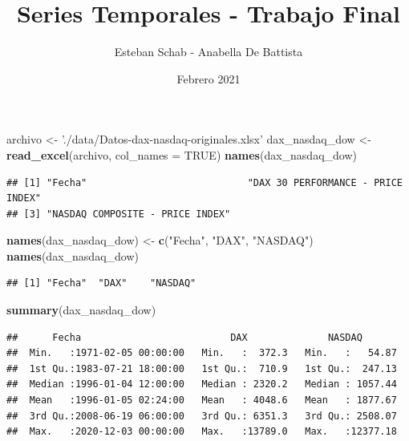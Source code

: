 \documentclass[
  11pt,
]{article}
\title{Series Temporales - Trabajo Final}
\author{Esteban Schab - Anabella De Battista}
\date{Febrero 2021}
\newenvironment{Shaded}{\begin{snugshade}}{\end{snugshade}}
\newcommand{\DataTypeTok}[1]{\textcolor[rgb]{0.13,0.29,0.53}{#1}}
\newcommand{\KeywordTok}[1]{\textcolor[rgb]{0.13,0.29,0.53}{\textbf{#1}}}
\newcommand{\NormalTok}[1]{#1}
\newcommand{\OtherTok}[1]{\textcolor[rgb]{0.56,0.35,0.01}{#1}}
\newcommand{\StringTok}[1]{\textcolor[rgb]{0.31,0.60,0.02}{#1}}
\begin{document}
\maketitle

{
\setcounter{tocdepth}{2}
\tableofcontents
}
\begin{Shaded}
\begin{Highlighting}[]
\NormalTok{archivo <-}\StringTok{ './data/Datos-dax-nasdaq-originales.xlsx'}
\NormalTok{dax_nasdaq_dow <-}\StringTok{ }\KeywordTok{read_excel}\NormalTok{(archivo, }\DataTypeTok{col_names =} \OtherTok{TRUE}\NormalTok{)}
\KeywordTok{names}\NormalTok{(dax_nasdaq_dow)}
\end{Highlighting}
\end{Shaded}

\begin{verbatim}
## [1] "Fecha"                            "DAX 30 PERFORMANCE - PRICE INDEX"
## [3] "NASDAQ COMPOSITE - PRICE INDEX"
\end{verbatim}

\begin{Shaded}
\begin{Highlighting}[]
\KeywordTok{names}\NormalTok{(dax_nasdaq_dow) <-}\StringTok{ }\KeywordTok{c}\NormalTok{(}\StringTok{"Fecha"}\NormalTok{, }\StringTok{"DAX"}\NormalTok{, }\StringTok{"NASDAQ"}\NormalTok{)}
\KeywordTok{names}\NormalTok{(dax_nasdaq_dow)}
\end{Highlighting}
\end{Shaded}

\begin{verbatim}
## [1] "Fecha"  "DAX"    "NASDAQ"
\end{verbatim}

\begin{Shaded}
\begin{Highlighting}[]
\KeywordTok{summary}\NormalTok{(dax_nasdaq_dow)}
\end{Highlighting}
\end{Shaded}

\begin{verbatim}
##      Fecha                          DAX              NASDAQ        
##  Min.   :1971-02-05 00:00:00   Min.   :  372.3   Min.   :   54.87  
##  1st Qu.:1983-07-21 18:00:00   1st Qu.:  710.9   1st Qu.:  247.13  
##  Median :1996-01-04 12:00:00   Median : 2320.2   Median : 1057.44  
##  Mean   :1996-01-05 02:24:00   Mean   : 4048.6   Mean   : 1877.67  
##  3rd Qu.:2008-06-19 06:00:00   3rd Qu.: 6351.3   3rd Qu.: 2508.07  
##  Max.   :2020-12-03 00:00:00   Max.   :13789.0   Max.   :12377.18
\end{verbatim}
\end{document}
